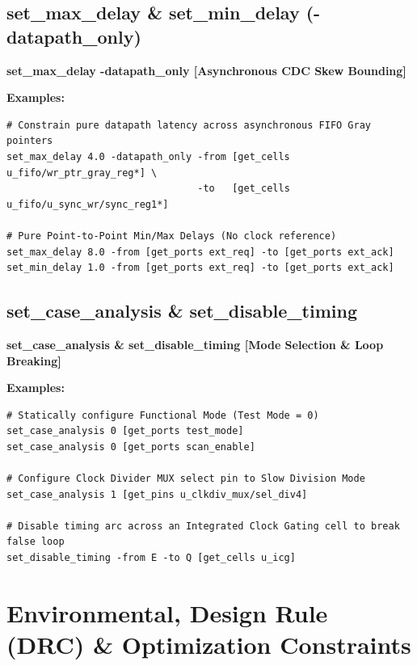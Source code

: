 \documentclass[11pt,a4paper]{article}
\newenvironment{cmdbox}[2]{%
  \begin{mdframed}[style=cmdstyle]%
  {\bfseries\sffamily\color{primary}#1 \hfill \footnotesize\color{mutedgray}[#2]}\par\vspace{3pt}%
}{%
  \end{mdframed}%
}
\begin{document}
\subsection{set\_max\_delay \& set\_min\_delay (-datapath\_only)}
\begin{cmdbox}{set\_max\_delay -datapath\_only}{Asynchronous CDC Skew Bounding}
\textbf{Examples:}
\begin{lstlisting}[style=sdcstyle]
# Constrain pure datapath latency across asynchronous FIFO Gray pointers
set_max_delay 4.0 -datapath_only -from [get_cells u_fifo/wr_ptr_gray_reg*] \
                                 -to   [get_cells u_fifo/u_sync_wr/sync_reg1*]

# Pure Point-to-Point Min/Max Delays (No clock reference)
set_max_delay 8.0 -from [get_ports ext_req] -to [get_ports ext_ack]
set_min_delay 1.0 -from [get_ports ext_req] -to [get_ports ext_ack]
\end{lstlisting}
\end{cmdbox}

\subsection{set\_case\_analysis \& set\_disable\_timing}
\begin{cmdbox}{set\_case\_analysis \& set\_disable\_timing}{Mode Selection \& Loop Breaking}
\textbf{Examples:}
\begin{lstlisting}[style=sdcstyle]
# Statically configure Functional Mode (Test Mode = 0)
set_case_analysis 0 [get_ports test_mode]
set_case_analysis 0 [get_ports scan_enable]

# Configure Clock Divider MUX select pin to Slow Division Mode
set_case_analysis 1 [get_pins u_clkdiv_mux/sel_div4]

# Disable timing arc across an Integrated Clock Gating cell to break false loop
set_disable_timing -from E -to Q [get_cells u_icg]
\end{lstlisting}
\end{cmdbox}

\section{Environmental, Design Rule (DRC) \& Optimization Constraints}
\end{document}
